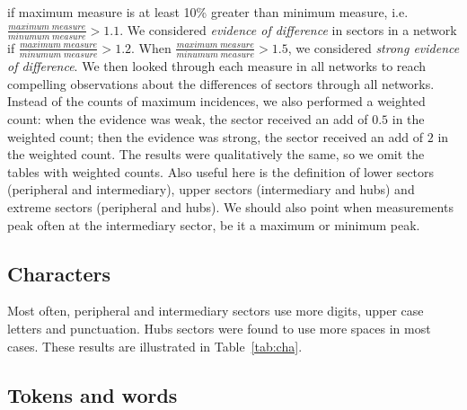 if maximum measure is at least 10\% greater than minimum measure,
i.e. $\frac{maximum\;measure}{minumum\;measure}>1.1$.
We considered \emph{evidence of difference} in sectors in a network if
$\frac{maximum\;measure}{minumum\;measure}>1.2$.
When 
$\frac{maximum\;measure}{minumum\;measure}>1.5$, we considered \emph{strong evidence of difference}.
We then looked through each measure in all networks to reach compelling observations about the
differences of sectors through all networks.
Instead of the counts of maximum incidences, we also performed a weighted count:
when the evidence was weak, the sector received an add of $0.5$ in the weighted count;
then the evidence was strong, the sector received an add of $2$ in the weighted count.
The results were qualitatively the same, so we omit the tables with weighted counts.
Also useful here is the definition of lower sectors (peripheral and intermediary),
upper sectors (intermediary and hubs) and extreme sectors (peripheral and hubs).
We should also point when measurements peak often at the intermediary sector,
be it a maximum or minimum peak.


\subsection{Characters}\label{sec:cha}
Most often, peripheral and intermediary sectors use more digits, upper case letters and punctuation.
Hubs sectors were found to use more spaces in most cases. 
These results are illustrated in Table~\ref{tab:cha}.

\FloatBarrier

\subsection{Tokens and words}\label{subsec:tw}
%

